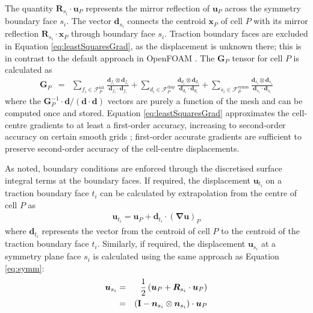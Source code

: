 \documentclass[sn-mathphys,Numbered]{sn-jnl}%
\newcommand{\bb}{\boldsymbol}
\begin{document}
The quantity $\bb{R}_{s_i} \cdot \bb{u}_P$ represents the mirror reflection of $\bb{u}_P$ across the symmetry boundary face $s_i$.
The vector $\bb{d}_{s_i}$ connects the centroid $\bb{x}_P$ of cell $P$ with its mirror reflection $\bb{R}_{s_i}  \cdot \bb{x}_P$ through boundary face $s_i$.
Traction boundary faces are excluded in Equation \ref{eq:leastSquaresGrad}, as the displacement is unknown there; this is in contrast to the default approach in OpenFOAM \citep{Jasak2011}.
The $\bb{G}_P$ tensor for cell $P$ is calculated as
\begin{eqnarray}
	 \bb{G}_P &=&
	 \sum_{{f_i} \in \mathcal{F}^{\text{int}}_P} \frac{\bb{d}_{f_i} \otimes \bb{d}_{f_i}}{\bb{d}_{f_i} \cdot \bb{d}_{f_i}}
	 +  \sum_{{d_i} \in \mathcal{F}^{\text{disp}}_P} \frac{\bb{d}_{d_i} \otimes \bb{d}_{d_i}}{\bb{d}_{d_i} \cdot \bb{d}_{d_i}}
	 +  \sum_{{s_i} \in \mathcal{F}^{\text{symm}}_P} \frac{\bb{d}_{s_i} \otimes \bb{d}_{s_i}}{\bb{d}_{s_i} \cdot \bb{d}_{s_i}}
\end{eqnarray}
where the $\bb{G}^{-1}_P \cdot \bb{d}/(\bb{d}\cdot \bb{d})$ vectors are purely a function of the mesh and can be computed once and stored.
Equation \ref{eq:leastSquaresGrad} approximates the cell-centre gradients to at least a first-order accuracy, increasing to second-order accuracy on certain smooth grids \citep{Syrakos2023};
first-order accurate gradients are sufficient to preserve second-order accuracy of the cell-centre displacements.

As noted, boundary conditions are enforced through the discretised surface integral terms at the boundary faces. %
If required, the displacement $\bb{u}_{t_i}$ on a traction boundary face $t_i$ can be calculated by extrapolation from the centre of cell $P$ as
\begin{eqnarray}
	\bb{u}_{t_i} = \bb{u}_P + \bb{d}_{t_i} \cdot \left(\bb{\nabla} \bb{u} \right)_P
\end{eqnarray}
where $\bb{d}_{t_i}$ represents the vector from the centroid of cell $P$ to the centroid of the traction boundary face $t_i$.
Similarly, if required, the displacement $\bb{u}_{s_i}$ at a symmetry plane face $s_i$ is calculated using the same approach as Equation \ref{eq:symm}:
\begin{eqnarray} 
	\bb{u}_{s_i}
		&=&  \frac{1}{2} \left( \bb{u}_P + \bb{R}_{s_i} \cdot \bb{u}_P \right) \notag \\
		&=& \left (\textbf{I} - \bb{n}_{s_i} \otimes \bb{n}_{s_i} \right) \cdot \bb{u}_P
\end{eqnarray}
\end{document}
